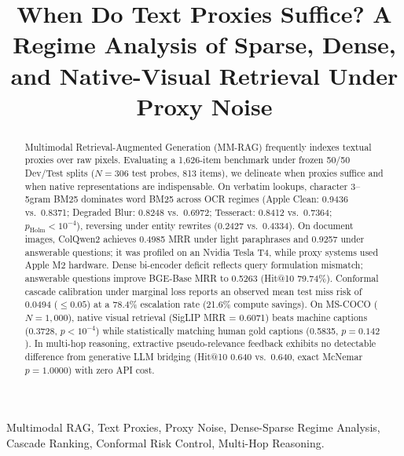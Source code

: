 \documentclass[conference]{IEEEtran}
\begin{document}
\title{When Do Text Proxies Suffice? A Regime Analysis of Sparse, Dense, and Native-Visual Retrieval Under Proxy Noise}

\author{
}

\maketitle

\begin{abstract}
Multimodal Retrieval-Augmented Generation (MM-RAG) frequently indexes textual proxies over raw pixels. Evaluating a 1,626-item benchmark under frozen 50/50 Dev/Test splits ($N=306$ test probes, 813 items), we delineate when proxies suffice and when native representations are indispensable. On verbatim lookups, character 3--5gram BM25 dominates word BM25 across OCR regimes (Apple Clean: 0.9436 vs.\ 0.8371; Degraded Blur: 0.8248 vs.\ 0.6972; Tesseract: 0.8412 vs.\ 0.7364; $p_{\text{Holm}} < 10^{-4}$), reversing under entity rewrites (0.2427 vs.\ 0.4334). On document images, ColQwen2 achieves 0.4985 MRR under light paraphrases and 0.9257 under answerable questions; it was profiled on an Nvidia Tesla T4, while proxy systems used Apple M2 hardware. Dense bi-encoder deficit reflects query formulation mismatch; answerable questions improve BGE-Base MRR to 0.5263 (Hit@10 79.74\%). Conformal cascade calibration under marginal loss reports an observed mean test miss risk of 0.0494 ($\le 0.05$) at a 78.4\% escalation rate (21.6\% compute savings). On MS-COCO ($N=1{,}000$), native visual retrieval (SigLIP MRR = 0.6071) beats machine captions (0.3728, $p < 10^{-4}$) while statistically matching human gold captions (0.5835, $p=0.142$). In multi-hop reasoning, extractive pseudo-relevance feedback exhibits no detectable difference from generative LLM bridging (Hit@10 0.640 vs.\ 0.640, exact McNemar $p = 1.0000$) with zero API cost.
\end{abstract}

\begin{IEEEkeywords}
Multimodal RAG, Text Proxies, Proxy Noise, Dense-Sparse Regime Analysis, Cascade Ranking, Conformal Risk Control, Multi-Hop Reasoning.
\end{IEEEkeywords}
\end{document}
